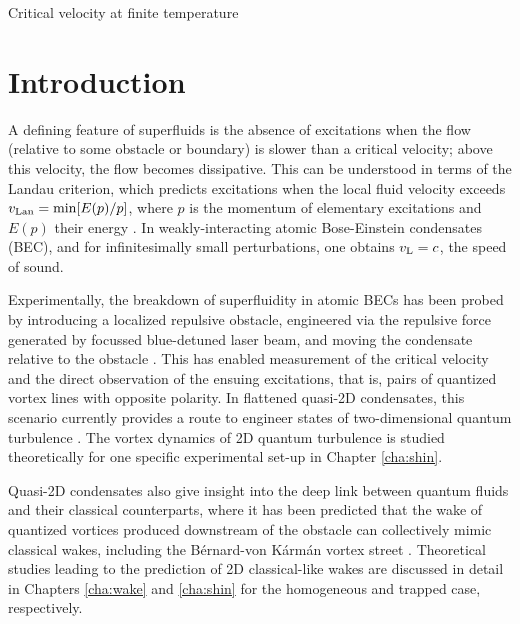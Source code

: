 \begin{chapter}{\label{cha:nonequib}Critical velocity at finite temperature}
\section{Introduction}
A defining feature of superfluids is the absence of excitations when the flow (relative to some obstacle or boundary) is slower than a critical velocity; above this velocity, the flow becomes dissipative.  This can be understood in terms of the Landau criterion, which predicts excitations when the local fluid velocity exceeds $v_{\rm Lan} = \textrm{min} [E(p)/p]$, where $p$ is the momentum of elementary excitations and $E(p)$ their energy \cite{NozieresPines}. In weakly-interacting atomic Bose-Einstein condensates (BEC), and for infinitesimally small perturbations, one obtains $v_{\rm L} = c$, the speed of sound.

Experimentally, the breakdown of superfluidity in atomic BECs has been probed by introducing a localized repulsive obstacle, engineered via the repulsive force generated by focussed blue-detuned laser beam, and moving the condensate relative to the obstacle \cite{Neely,kwon_moon_14,kwon_2015a,kwon_2015b,Raman,Onofrio,Inouye,desbuquois_2012}. This has enabled measurement of the critical velocity and the direct observation of the ensuing excitations, that is, pairs of quantized vortex lines with opposite polarity.
In flattened quasi-2D condensates, this scenario currently provides a route to engineer states of two-dimensional quantum turbulence \cite{Neely,kwon_moon_14}. The vortex dynamics of 2D quantum turbulence is studied theoretically for one specific experimental set-up \cite{kwon_moon_14} in Chapter \ref{cha:shin}.

Quasi-2D condensates also give insight into the deep link between quantum fluids and their classical counterparts, where it has been predicted that the wake of quantized
vortices produced downstream of the obstacle can collectively mimic classical wakes, including the B{\' e}rnard-von K{\'a}rm{\' a}n vortex street
\cite{saito10,stagg_parker_14,reeves_2015}. Theoretical studies leading to the prediction of 2D classical-like wakes are discussed in detail in Chapters \ref{cha:wake} and \ref{cha:shin} for the homogeneous and trapped case, respectively.


\end{chapter}

